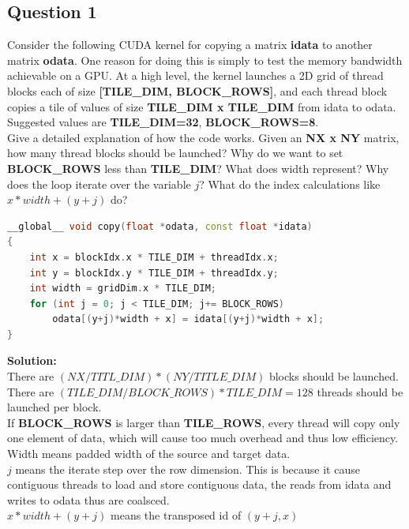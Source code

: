 \documentclass{article}
\begin{document}
\subsection{Question 1}
Consider the following CUDA kernel for copying a matrix \textbf{idata} to another matrix \textbf{odata}. One reason for doing this is simply to test the memory bandwidth achievable on a GPU. At a high level, the kernel launches a 2D grid of thread 
blocks each of size \textbf{[TILE\_DIM, BLOCK\_ROWS]}, and each thread block copies 
a tile of values of size \textbf{TILE\_DIM x TILE\_DIM} from idata to odata. 
Suggested values are \textbf{TILE\_DIM=32}, \textbf{BLOCK\_ROWS=8}.\\
Give a detailed explanation of how the code works. Given an \textbf{NX x NY} matrix, 
how many thread blocks should be launched? Why do we want to set 
\textbf{BLOCK\_ROWS} less than \textbf{TILE\_DIM}? What does width represent? Why does the loop iterate over the variable $j$? What do the index calculations like $x*width+(y+j)$ do? 
\begin{lstlisting}[language=c++]
__global__ void copy(float *odata, const float *idata)
{
    int x = blockIdx.x * TILE_DIM + threadIdx.x;
    int y = blockIdx.y * TILE_DIM + threadIdx.y;
    int width = gridDim.x * TILE_DIM;
    for (int j = 0; j < TILE_DIM; j+= BLOCK_ROWS)
        odata[(y+j)*width + x] = idata[(y+j)*width + x];
}
\end{lstlisting}
\textbf{Solution: }\\
There are $(NX/TITL\_DIM)*(NY/TITLE\_DIM)$ blocks should be launched. There are $(TILE\_DIM/BLOCK\_ROWS)*TILE\_DIM = 128$ threads should be launched per block.\\
If \textbf{BLOCK\_ROWS} is larger than \textbf{TILE\_ROWS}, every thread will copy only one element of data, which will cause too much overhead and thus low efficiency.\\
Width means padded width of the source and target data.\\
$j$ means the iterate step over the row dimension. This is because it cause contiguous threads to load and store contiguous data, the reads from idata and writes to odata thus are coalsced.\\
$x*width+(y+j)$ means the transposed id of $(y+j,x)$
\end{document}
